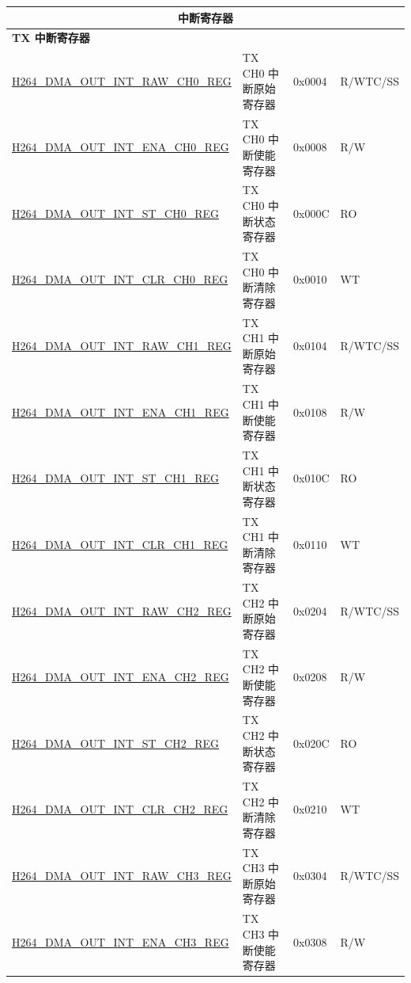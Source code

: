 \begin{longtable}{ | p{7.5cm} | p{5.7cm} | p{1.2cm} | p{1cm} | }
\multicolumn{4}{|c|}{\cellcolor{gray!15}\textbf{中断寄存器}} \\ \hline
\multicolumn{4}{|l|}{\textbf{TX 中断寄存器}} \\ \hline
    \hyperref[regdesc:H264DMAOUTINTRAWCH0REG]{H264\_DMA\_OUT\_INT\_RAW\_CH0\_REG} & TX CH0 中断原始寄存器 & 0x0004 & R/WTC/SS \\ \hline
    \hyperref[regdesc:H264DMAOUTINTENACH0REG]{H264\_DMA\_OUT\_INT\_ENA\_CH0\_REG} & TX CH0 中断使能寄存器 & 0x0008 & R/W \\ \hline
    \hyperref[regdesc:H264DMAOUTINTSTCH0REG]{H264\_DMA\_OUT\_INT\_ST\_CH0\_REG} & TX CH0 中断状态寄存器 & 0x000C & RO \\ \hline
    \hyperref[regdesc:H264DMAOUTINTCLRCH0REG]{H264\_DMA\_OUT\_INT\_CLR\_CH0\_REG} & TX CH0 中断清除寄存器 & 0x0010 & WT \\ \hline
    \hyperref[regdesc:H264DMAOUTINTRAWCH1REG]{H264\_DMA\_OUT\_INT\_RAW\_CH1\_REG} & TX CH1 中断原始寄存器 & 0x0104 & R/WTC/SS \\ \hline
    \hyperref[regdesc:H264DMAOUTINTENACH1REG]{H264\_DMA\_OUT\_INT\_ENA\_CH1\_REG} & TX CH1 中断使能寄存器 & 0x0108 & R/W \\ \hline
    \hyperref[regdesc:H264DMAOUTINTSTCH1REG]{H264\_DMA\_OUT\_INT\_ST\_CH1\_REG} & TX CH1 中断状态寄存器 & 0x010C & RO \\ \hline
    \hyperref[regdesc:H264DMAOUTINTCLRCH1REG]{H264\_DMA\_OUT\_INT\_CLR\_CH1\_REG} & TX CH1 中断清除寄存器 & 0x0110 & WT \\ \hline
    \hyperref[regdesc:H264DMAOUTINTRAWCH2REG]{H264\_DMA\_OUT\_INT\_RAW\_CH2\_REG} & TX CH2 中断原始寄存器 & 0x0204 & R/WTC/SS \\ \hline
    \hyperref[regdesc:H264DMAOUTINTENACH2REG]{H264\_DMA\_OUT\_INT\_ENA\_CH2\_REG} & TX CH2 中断使能寄存器 & 0x0208 & R/W \\ \hline
    \hyperref[regdesc:H264DMAOUTINTSTCH2REG]{H264\_DMA\_OUT\_INT\_ST\_CH2\_REG} & TX CH2 中断状态寄存器 & 0x020C & RO \\ \hline
    \hyperref[regdesc:H264DMAOUTINTCLRCH2REG]{H264\_DMA\_OUT\_INT\_CLR\_CH2\_REG} & TX CH2 中断清除寄存器 & 0x0210 & WT \\ \hline
    \hyperref[regdesc:H264DMAOUTINTRAWCH3REG]{H264\_DMA\_OUT\_INT\_RAW\_CH3\_REG} & TX CH3 中断原始寄存器 & 0x0304 & R/WTC/SS \\ \hline
    \hyperref[regdesc:H264DMAOUTINTENACH3REG]{H264\_DMA\_OUT\_INT\_ENA\_CH3\_REG} & TX CH3 中断使能寄存器 & 0x0308 & R/W \\ \hline

\end{longtable}
